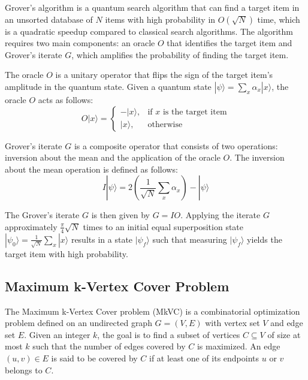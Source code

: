 Grover's algorithm \cite{grover1996fast} is a quantum search algorithm that can find a target item in an unsorted database of $N$ items with high probability in $O(\sqrt{N})$ time, which is a quadratic speedup compared to classical search algorithms. The algorithm requires two main components: an oracle $O$ that identifies the target item and Grover's iterate $G$, which amplifies the probability of finding the target item.

The oracle $O$ is a unitary operator that flips the sign of the target item's amplitude in the quantum state. Given a quantum state $|\psi\rangle = \sum_{x} \alpha_x |x\rangle$, the oracle $O$ acts as follows:
\begin{equation}
    O |x\rangle = \begin{cases} -|x\rangle, & \text{if } x \text{ is the target item} \\ |x\rangle, & \text{otherwise} \end{cases}
\end{equation}

Grover's iterate $G$ is a composite operator that consists of two operations: inversion about the mean and the application of the oracle $O$. The inversion about the mean operation is defined as follows:
\begin{equation}
    I |\psi\rangle = 2\left(\frac{1}{\sqrt{N}}\sum_{x}\alpha_x\right) - |\psi\rangle
\end{equation}

The Grover's iterate $G$ is then given by $G = I O$. Applying the iterate $G$ approximately $\frac{\pi}{4}\sqrt{N}$ times to an initial equal superposition state $|\psi_0\rangle = \frac{1}{\sqrt{N}}\sum_{x}|x\rangle$ results in a state $|\psi_f\rangle$ such that measuring $|\psi_f\rangle$ yields the target item with high probability.

\subsection{Maximum k-Vertex Cover Problem}
\label{subsec:mkvc}

The Maximum k-Vertex Cover problem (MkVC) is a combinatorial optimization problem defined on an undirected graph $G = (V, E)$ with vertex set $V$ and edge set $E$. Given an integer $k$, the goal is to find a subset of vertices $C \subseteq V$ of size at most $k$ such that the number of edges covered by $C$ is maximized. An edge $(u, v) \in E$ is said to be covered by $C$ if at least one of its endpoints $u$ or $v$ belongs to $C$.

